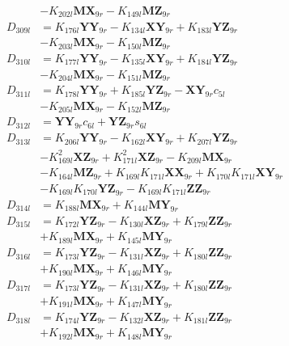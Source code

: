 \begin{align}
&- K_{202l}\mathbf{MX}_{9r} - K_{149l}\mathbf{MZ}_{9r} \nonumber \\
D_{309l} &= K_{176l}\mathbf{YY}_{9r} - K_{134l}\mathbf{XY}_{9r} + K_{183l}\mathbf{YZ}_{9r}  \nonumber \\
&- K_{203l}\mathbf{MX}_{9r} - K_{150l}\mathbf{MZ}_{9r} \nonumber \\
D_{310l} &= K_{177l}\mathbf{YY}_{9r} - K_{135l}\mathbf{XY}_{9r} + K_{184l}\mathbf{YZ}_{9r}  \nonumber \\
&- K_{204l}\mathbf{MX}_{9r} - K_{151l}\mathbf{MZ}_{9r} \nonumber \\
D_{311l} &= K_{178l}\mathbf{YY}_{9r} + K_{185l}\mathbf{YZ}_{9r} - \mathbf{XY}_{9r}c_{5l}  \nonumber \\
&- K_{205l}\mathbf{MX}_{9r} - K_{152l}\mathbf{MZ}_{9r} \nonumber \\
D_{312l} &= \mathbf{YY}_{9r}c_{6l} + \mathbf{YZ}_{9r}s_{6l} \nonumber \\
D_{313l} &= K_{206l}\mathbf{YY}_{9r} - K_{162l}\mathbf{XY}_{9r} + K_{207l}\mathbf{YZ}_{9r}  \nonumber \\
&- K_{169l}^2\mathbf{XZ}_{9r} + K_{171l}^2\mathbf{XZ}_{9r} - K_{209l}\mathbf{MX}_{9r}  \nonumber \\
&- K_{164l}\mathbf{MZ}_{9r} + K_{169l}K_{171l}\mathbf{XX}_{9r} + K_{170l}K_{171l}\mathbf{XY}_{9r}  \nonumber \\
&- K_{169l}K_{170l}\mathbf{YZ}_{9r} - K_{169l}K_{171l}\mathbf{ZZ}_{9r} \nonumber \\
D_{314l} &= K_{188l}\mathbf{MX}_{9r} + K_{144l}\mathbf{MY}_{9r} \nonumber \\
D_{315l} &= K_{172l}\mathbf{YZ}_{9r} - K_{130l}\mathbf{XZ}_{9r} + K_{179l}\mathbf{ZZ}_{9r}  \nonumber \\
&+ K_{189l}\mathbf{MX}_{9r} + K_{145l}\mathbf{MY}_{9r} \nonumber \\
D_{316l} &= K_{173l}\mathbf{YZ}_{9r} - K_{131l}\mathbf{XZ}_{9r} + K_{180l}\mathbf{ZZ}_{9r}  \nonumber \\
&+ K_{190l}\mathbf{MX}_{9r} + K_{146l}\mathbf{MY}_{9r} \nonumber \\
D_{317l} &= K_{173l}\mathbf{YZ}_{9r} - K_{131l}\mathbf{XZ}_{9r} + K_{180l}\mathbf{ZZ}_{9r}  \nonumber \\
&+ K_{191l}\mathbf{MX}_{9r} + K_{147l}\mathbf{MY}_{9r} \nonumber \\
D_{318l} &= K_{174l}\mathbf{YZ}_{9r} - K_{132l}\mathbf{XZ}_{9r} + K_{181l}\mathbf{ZZ}_{9r}  \nonumber \\
&+ K_{192l}\mathbf{MX}_{9r} + K_{148l}\mathbf{MY}_{9r} \nonumber \\

\end{align}
